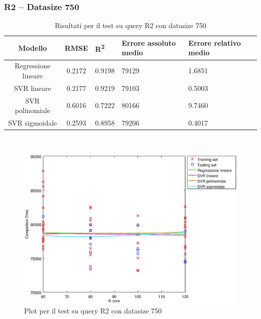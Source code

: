 \documentclass[a4paper,11pt]{article}
\begin{document}
\subsubsection{R2 -- Datasize 750}
\begin{table}[bhpt]
	\centering
	\begin{adjustbox}{center}
		\begin{tabular}{c | c M{1.2cm} M{2.5cm} M{2.5cm} M{1.8cm}}
			Modello & RMSE & R\textsuperscript{2} & Errore assoluto medio & Errore relativo medio \tabularnewline
			\hline
			Regressione lineare & 0.2172 & 0.9198 &  79129 & 1.6851 \\
			SVR lineare & 0.2177 & 0.9219 &  79103 & 0.5003 \\
			SVR polinomiale & 0.6016 & 0.7222 &  80166 & 9.7460 \\
			SVR sigmoidale & 0.2593 & 0.8958 &  79206 & 0.4017 \\
		\end{tabular}
	\end{adjustbox}
	\\
	\caption{Risultati per il test su query R2 con datasize 750}
	\label{table_R2_750}
\end{table}

\begin {figure}[hbtp]
\centering
\includegraphics[width=\textwidth]{output/R2_750/plot_R2_750.eps}
\caption {Plot per il test su query R2 con datasize 750}
\end {figure}
\newpage
\end{document}
